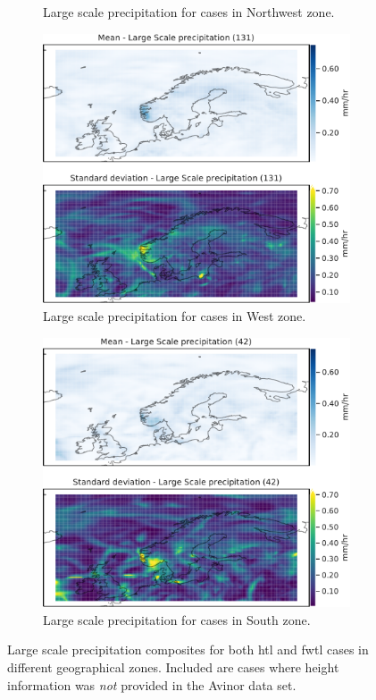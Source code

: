 \begin{figure}
\begin{subfigure}[b]{0.49\textwidth}
    \caption{Large scale precipitation for cases in Northwest zone.}
    \label{fig:NordWestlsP}
\end{subfigure}
\begin{subfigure}[b]{0.49\textwidth}
    \centering
    \includegraphics[width=\textwidth]{Figures/lsPVest.pdf}
    \caption{Large scale precipitation for cases in West zone.}
    \label{fig:WestlsP}
\end{subfigure}
\begin{subfigure}[b]{0.49\textwidth}
    \centering
    \includegraphics[width=\textwidth]{Figures/lsPSor.pdf}
    \caption{Large scale precipitation for cases in South zone.}
    \label{fig:SouthlsP}
\end{subfigure}
\caption{Large scale precipitation composites for both \acrshort{htl} and \acrshort{fwtl} cases in different geographical zones. Included are cases where height information was \textit{not} provided in the Avinor data set.}
\label{fig:largescalezones}
\end{figure}

